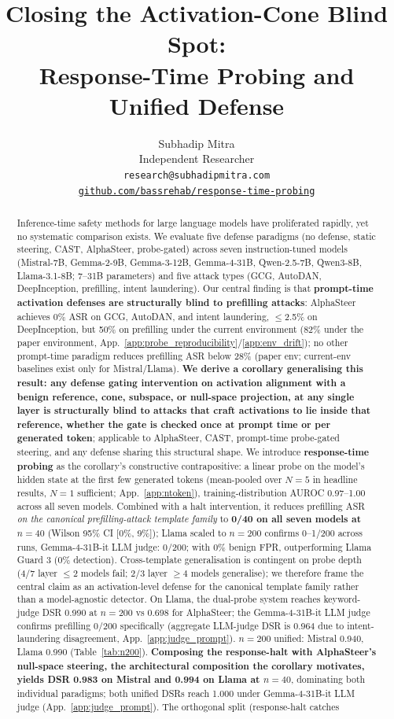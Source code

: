 \documentclass{article}
\title{Closing the Activation-Cone Blind Spot: \\ Response-Time Probing and Unified Defense}
\author{%
  Subhadip Mitra \\
  Independent Researcher \\
  \texttt{research@subhadipmitra.com} \\
  \href{https://github.com/bassrehab/response-time-probing}{\texttt{github.com/bassrehab/response-time-probing}}%
}
\begin{document}
\maketitle

\begin{abstract}
Inference-time safety methods for large language models have proliferated rapidly, yet no systematic comparison exists. We evaluate five defense paradigms (no defense, static steering, CAST, AlphaSteer, probe-gated) across seven instruction-tuned models (Mistral-7B, Gemma-2-9B, Gemma-3-12B, Gemma-4-31B, Qwen-2.5-7B, Qwen3-8B, Llama-3.1-8B; 7--31B parameters) and five attack types (GCG, AutoDAN, DeepInception, prefilling, intent laundering). Our central finding is that \textbf{prompt-time activation defenses are structurally blind to prefilling attacks}: AlphaSteer achieves 0\% ASR on GCG, AutoDAN, and intent laundering, $\leq$2.5\% on DeepInception, but 50\% on prefilling under the current environment (82\% under the paper environment, App.~\ref{app:probe_reproducibility}/\ref{app:env_drift}); no other prompt-time paradigm reduces prefilling ASR below 28\% (paper env; current-env baselines exist only for Mistral/Llama). \textbf{We derive a corollary generalising this result: any defense gating intervention on activation alignment with a benign reference, cone, subspace, or null-space projection, at any single layer is structurally blind to attacks that craft activations to lie inside that reference, whether the gate is checked once at prompt time or per generated token}; applicable to AlphaSteer, CAST, prompt-time probe-gated steering, and any defense sharing this structural shape. We introduce \textbf{response-time probing} as the corollary's constructive contrapositive: a linear probe on the model's hidden state at the first few generated tokens (mean-pooled over $N=5$ in headline results, $N=1$ sufficient; App.~\ref{app:ntoken}), training-distribution AUROC 0.97--1.00 across all seven models. Combined with a halt intervention, it reduces prefilling ASR \emph{on the canonical prefilling-attack template family} to \textbf{0/40 on all seven models at $n=40$} (Wilson 95\% CI [0\%, 9\%]); Llama scaled to $n=200$ confirms 0--1/200 across runs, Gemma-4-31B-it LLM judge: 0/200; with 0\% benign FPR, outperforming Llama Guard 3 (0\% detection). Cross-template generalisation is contingent on probe depth (4/7 layer $\leq 2$ models fail; 2/3 layer $\geq 4$ models generalise); we therefore frame the central claim as an activation-level defense for the canonical template family rather than a model-agnostic detector. On Llama, the dual-probe system reaches keyword-judge DSR 0.990 at $n=200$ vs 0.698 for AlphaSteer; the Gemma-4-31B-it LLM judge confirms prefilling 0/200 specifically (aggregate LLM-judge DSR is 0.964 due to intent-laundering disagreement, App.~\ref{app:judge_prompt}). $n=200$ unified: Mistral 0.940, Llama 0.990 (Table~\ref{tab:n200}). \textbf{Composing the response-halt with AlphaSteer's null-space steering, the architectural composition the corollary motivates, yields DSR 0.983 on Mistral and 0.994 on Llama at $n=40$}, dominating both individual paradigms; both unified DSRs reach 1.000 under Gemma-4-31B-it LLM judge (App.~\ref{app:judge_prompt}). The orthogonal split (response-halt catches 
\end{abstract}
\end{document}
